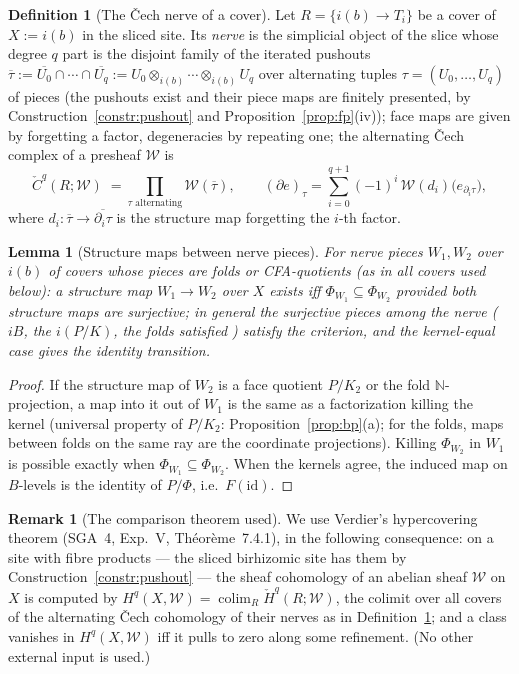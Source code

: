 \documentclass[11pt]{article}
\newtheorem{lemma}[theorem]{Lemma}
\theoremstyle{definition}
\newtheorem{definition}[theorem]{Definition}
\newtheorem{remark}[theorem]{Remark}
\newcommand{\colim}{\operatorname*{colim}}
\newcommand{\HH}{\check{H}}
\newcommand{\cC}{\check{C}}
\begin{document}
\begin{definition}[The \v{C}ech nerve of a cover]\label{def:nerve}
Let $R=\{i(b)\to T_i\}$ be a cover of $X:=i(b)$ in the sliced site.
Its \emph{nerve} is the simplicial object of the slice whose degree
$q$ part is the disjoint family of the iterated pushouts
$\overline\tau:=\overline{U_0}\cap\cdots\cap
\overline{U_q}:=U_0\otimes_{i(b)}\cdots\otimes_{i(b)}U_q$
over alternating tuples $\tau=(U_0,\dots,U_q)$ of pieces
\textup{(}the pushouts exist and their piece maps are finitely
presented, by Construction~\ref{constr:pushout} and
Proposition~\ref{prop:fp}\textup{(}iv\textup{)}\textup{)}; face
maps are given by forgetting a factor, degeneracies by repeating
one; the alternating \v{C}ech complex of a presheaf $\mathscr W$
is
\[
\cC^{q}(R;\mathscr W)\;=\!\!\prod_{\tau\text{ alternating}}
\mathscr W(\overline\tau),\qquad
(\partial e)_\tau=\sum_{i=0}^{q+1}(-1)^i\,
\mathscr W(d_i)\bigl(e_{\partial_i\tau}\bigr) ,
\]
where $d_i:\overline\tau\to\overline{\partial_i\tau}$ is the
structure map forgetting the $i$-th factor.
\end{definition}

\begin{lemma}[Structure maps between nerve pieces]\label{lem:nervemaps}
For nerve pieces $W_1,W_2$ over $i(b)$ of covers whose pieces
are folds or CFA-quotients \textup{(}as in all covers used
below\textup{)}: a structure map $W_1\to W_2$ over $X$ exists iff
$\Phi_{W_1}\subseteq\Phi_{W_2}$ provided both structure maps are
surjective; in general the surjective pieces among the nerve
\textup{(}$iB$, the $i(P/K)$, the folds satisfied
\textup{)} satisfy the criterion, and the kernel-equal case gives
the identity transition.
\end{lemma}

\begin{proof}
If the structure map of $W_2$ is a face quotient $P/K_2$ or the
fold $\mathbb N$-projection, a map into it out of $W_1$ is the
same as a factorization killing the kernel (universal property
of $P/K_2$: Proposition~\ref{prop:bp}(a); for the folds, maps
between folds on the same ray are the coordinate projections).
Killing $\Phi_{W_2}$ in $W_1$ is possible exactly when
$\Phi_{W_1}\subseteq\Phi_{W_2}$. When the kernels agree, the
induced map on $B$-levels is the identity of
$P/\Phi$, i.e.\ $F(\mathrm{id})$.
\end{proof}

\begin{remark}[The comparison theorem used]\label{rem:verdier}
We use Verdier's hypercovering theorem (SGA~4,
Exp.~V, Th\'eor\`eme~7.4.1), in the following consequence:
on a site with fibre products --- the sliced birhizomic site has
them by Construction~\ref{constr:pushout} --- the sheaf
cohomology of an abelian sheaf $\mathscr W$ on $X$ is computed
by
$H^q(X,\mathscr W)=\colim_{R}\HH^{q}(R;\mathscr W)$,
the colimit over all covers of the alternating \v{C}ech
cohomology of their nerves as in Definition~\ref{def:nerve}; and
a class vanishes in $H^q(X,\mathscr W)$ iff it pulls to zero
along some refinement. (No other external input is used.)
\end{remark}
\end{document}
